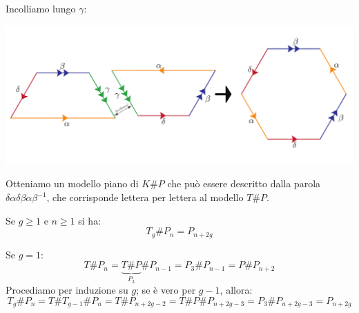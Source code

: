 \begin{demonstration}
\begin{center}
\end{center}
Incolliamo lungo $\gamma$:
\begin{center}
	\includegraphics[trim=0cm 0cm 0cm 0cm, clip, scale=0.3]{images/kleinplusproj2.pdf}
\end{center}
Otteniamo un modello piano di $K\# P$ che può essere descritto dalla parola $\delta \alpha \delta\beta\alpha\beta^{-1}$, che corrisponde lettera per lettera al modello $T\# P$.
\end{demonstration}
\begin{corollary}\label{toropiupiano}
Se $g\geq 1$ e $n\geq 1$ si ha:
\begin{equation}
	T_g\# P_n=P_{n+2g}
\end{equation}
\vspace{-6mm}
\end{corollary}
\begin{demonstration}
	Se $g=1$:
	\begin{equation*}
		T\# P_n=\underbrace{T\# P}_{P_3}\# P_{n-1}=P_3\# P_{n-1}=P\# P_{n+2}
	\end{equation*}
Procediamo per induzione su $g$; se è vero per $g-1$, allora:
\begin{equation*}
	T_g\# P_n=T\# T_{g-1}\# P_n=T\# P_{n+2g-2}=T\# P\# P_{n+2g-3}=P_3\# P_{n+2g-3}=P_{n+2g}
\end{equation*}
\end{demonstration}
